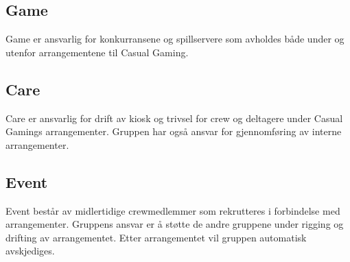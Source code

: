 \subsection{Game}
Game er ansvarlig for konkurransene og spillservere som avholdes både under og utenfor arrangementene til Casual Gaming.

\subsection{Care}
Care er ansvarlig for drift av kiosk og trivsel for crew og deltagere under Casual Gamings arrangementer. Gruppen har også ansvar for gjennomføring av interne arrangementer.

\subsection{Event}
Event består av midlertidige crewmedlemmer som rekrutteres i forbindelse med arrangementer. Gruppens ansvar er å støtte de andre gruppene under rigging og drifting av arrangementet. Etter arrangementet vil gruppen automatisk avskjediges.
